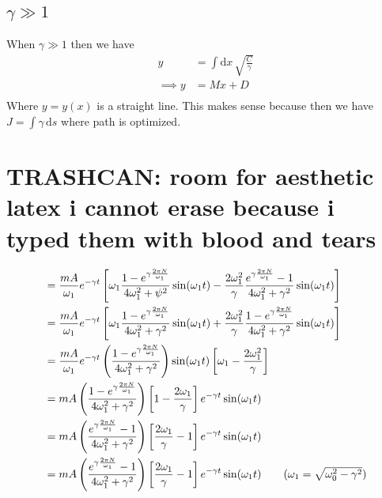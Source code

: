 \documentclass[10pts, letterpaper]{article}
\begin{document}
\subsection*{$\gamma \gg 1$ } 
When $\gamma \gg 1$ then we have 
\begin{align*}
	y &= \int \mathrm{d} x \, 
\sqrt{\frac{C}{\gamma }}  
	\\
	\implies 
	y &= M x + D \\
\end{align*}
Where $y = y(x)$ is a straight line. This makes sense because then we have $J = \int \gamma \, \mathrm{d} s$ where path is optimized. 




\newpage 
\section*{TRASHCAN: room for aesthetic latex i cannot erase because i typed them with blood and tears} 
\begin{align*}
	&= 
	\frac{m A}{\omega_1 }e^{ - \gamma t} 
	\left[
\omega_1 \frac{1 - e^{ \gamma \frac{2 \pi N }{ \omega_1 } } }{4 \omega_1 ^2 + \psi ^2 } \sin (\omega_1 t) - 
\frac{2 \omega_1^2 }{\gamma } \frac{e^{\gamma \frac{2 \pi N }{\omega_1 } } - 1 }{4 \omega_1 ^2 + \gamma^2 } \sin(\omega_1 t )
	\right]
	\\
	&= 
	\frac{m A}{\omega_1 }e^{ - \gamma t} 
	\left[
\omega_1 \frac{1 - e^{ \gamma \frac{2 \pi N }{ \omega_1 } } }{4 \omega_1 ^2 + \gamma ^2 } \sin (\omega_1 t) +
\frac{2 \omega_1^2 }{\gamma } \frac{1-e^{\gamma \frac{2 \pi N }{\omega_1 } } }{4 \omega_1 ^2 + \gamma^2 } \sin(\omega_1 t )
	\right]
     \\ &=
	\frac{mA}{\omega_1} e^{- \gamma t} 
	\left(\frac{1 - e^{ \gamma \frac{2 \pi N}{\omega_1 } } }{4 \omega_1 ^2 + \gamma^2 }
		\right) \sin(\omega_1 t)
		\left[ \omega_1 - \frac{2 \omega_1^2 }{\gamma} \right]
     \\ &=
	mA
	\left(\frac{1 - e^{ \gamma \frac{2 \pi N}{\omega_1 } } }{4 \omega_1 ^2 + \gamma^2 }
		\right) 
		\left[ 1 - \frac{2 \omega_1 }{\gamma} \right] e^{- \gamma t} \sin(\omega_1 t)
     \\ &=
	mA
	\left(\frac{ e^{ \gamma \frac{2 \pi N}{\omega_1 } } - 1 }{4 \omega_1 ^2 + \gamma^2 }
		\right) 
		\left[  \frac{2 \omega_1 }{\gamma} - 1 \right] e^{- \gamma t} \sin(\omega_1 t)
     \\ &=
	mA
	\left(\frac{ e^{ \gamma \frac{2 \pi N}{\omega_1 } } - 1 }{4 \omega_1 ^2 + \gamma^2 }
		\right) 
		\left[  \frac{2 \omega_1 }{\gamma} - 1 \right] e^{- \gamma t} \sin(\omega_1 t) 
		\tag{$\omega_1 = \sqrt{\omega_0^2 - \gamma^2} $}
\end{align*}
\end{document}
